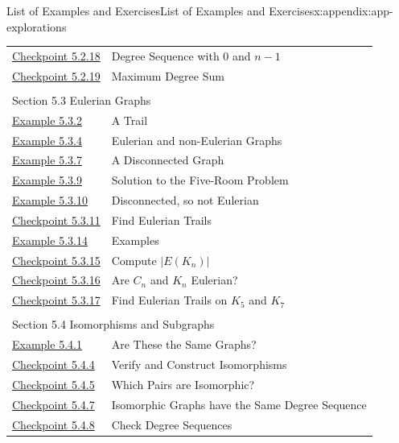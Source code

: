 \documentclass[oneside,10pt,]{book}
\numberwithin{equation}{section}
\begin{document}
\begin{appendixptx}{List of Examples and Exercises}{}{List of Examples and Exercises}{}{}{x:appendix:app-explorations}
\begin{longtable}[l]{ll}
\hyperref[x:exercise:ex-graph-degree-0-n-1]{Checkpoint 5.2.18}& Degree Sequence with 0 and \(n-1\)\\
\hyperref[x:exercise:ex-graph-degree-sum-max]{Checkpoint 5.2.19}& Maximum Degree Sum\\
\multicolumn{2}{l}{\null}\\[1.5ex] \multicolumn{2}{l}{\large Section 5.3 Eulerian Graphs}\\[0.5ex]
\hyperref[x:example:eg-graph-trail]{Example 5.3.2}& A Trail\\
\hyperref[x:example:eg-graph-eulerian]{Example 5.3.4}& Eulerian and non-Eulerian Graphs\\
\hyperref[x:example:eg-graph-connected]{Example 5.3.7}& A Disconnected Graph\\
\hyperref[x:example:eg-graph-model-room-solution]{Example 5.3.9}& Solution to the Five-Room Problem\\
\hyperref[x:example:eg-graph-not-eulerian]{Example 5.3.10}& Disconnected, so not Eulerian\\
\hyperref[x:exercise:ex-graph-find-eulerian-trail]{Checkpoint 5.3.11}& Find Eulerian Trails\\
\hyperref[x:example:eg-cycle-complete]{Example 5.3.14}& Examples\\
\hyperref[x:exercise:ex-graph-complete-edges]{Checkpoint 5.3.15}& Compute \(|E(K_n)|\)\\
\hyperref[x:exercise:ex-graph-cycle-complete-degrees]{Checkpoint 5.3.16}& Are \(C_n\) and \(K_n\) Eulerian?\\
\hyperref[x:exercise:ex-graph-complete-find-eulerian]{Checkpoint 5.3.17}& Find Eulerian Trails on \(K_5\) and \(K_7\)\\
\multicolumn{2}{l}{\null}\\[1.5ex] \multicolumn{2}{l}{\large Section 5.4 Isomorphisms and Subgraphs}\\[0.5ex]
\hyperref[x:example:eg-graph-equal-isomorphic]{Example 5.4.1}& Are These the Same Graphs?\\
\hyperref[x:exercise:ex-graph-isomorphism]{Checkpoint 5.4.4}& Verify and Construct Isomorphisms\\
\hyperref[x:exercise:ex-graph-determine-isomorphism]{Checkpoint 5.4.5}& Which Pairs are Isomorphic?\\
\hyperref[x:exercise:ex-graph-isomorphism-degree]{Checkpoint 5.4.7}& Isomorphic Graphs have the Same Degree Sequence\\
\hyperref[x:exercise:ex-graph-isomorphism-degree-check]{Checkpoint 5.4.8}& Check Degree Sequences\\

\end{longtable}
\end{appendixptx}
\end{document}
